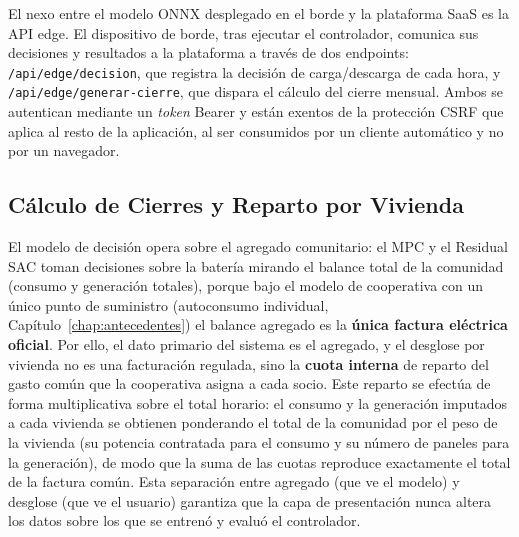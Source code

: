\documentclass[12pt, a4paper, twoside]{report}
\begin{document}
El nexo entre el modelo ONNX desplegado en el borde y la plataforma SaaS es la
API edge. El dispositivo de borde, tras ejecutar el controlador, comunica sus
decisiones y resultados a la plataforma a través de dos endpoints:
\texttt{/api/edge/decision}, que registra la decisión de carga/descarga de cada
hora, y \texttt{/api/edge/generar-cierre}, que dispara el cálculo del cierre
mensual. Ambos se autentican mediante un \textit{token} Bearer y están exentos
de la protección CSRF que aplica al resto de la aplicación, al ser consumidos
por un cliente automático y no por un navegador.

\subsection{Cálculo de Cierres y Reparto por Vivienda}
\label{sub:cierres}

El modelo de decisión opera sobre el agregado comunitario: el MPC y el Residual
SAC toman decisiones sobre la batería mirando el balance total de la comunidad
(consumo y generación totales), porque bajo el modelo de cooperativa con un único
punto de suministro (autoconsumo individual, Capítulo~\ref{chap:antecedentes}) el
balance agregado es la \textbf{única factura eléctrica oficial}. Por ello, el dato
primario del sistema es el agregado, y el desglose por vivienda no es una
facturación regulada, sino la \textbf{cuota interna} de reparto del gasto común
que la cooperativa asigna a cada socio. Este reparto se efectúa de forma
multiplicativa sobre el total horario: el consumo y la generación imputados a cada
vivienda se obtienen ponderando el total de la comunidad por el peso de la
vivienda (su potencia contratada para el consumo y su número de paneles para la
generación), de modo que la suma de las cuotas reproduce exactamente el total de
la factura común. Esta separación entre agregado (que ve el modelo) y desglose
(que ve el usuario) garantiza que la capa de presentación nunca altera los datos
sobre los que se entrenó y evaluó el controlador.
\end{document}
